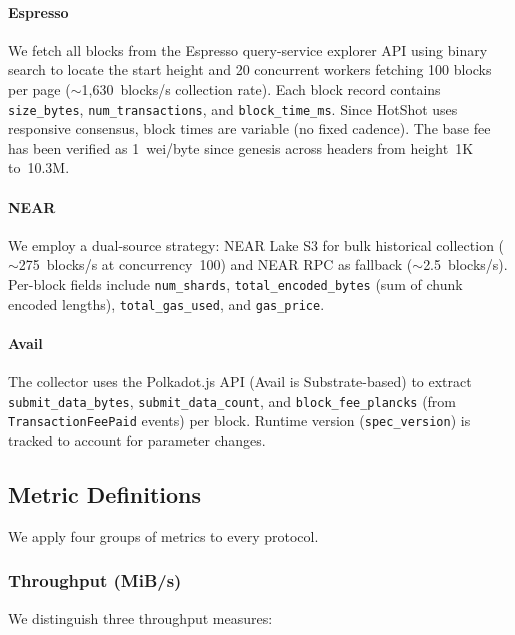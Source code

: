 \paragraph{Espresso}
We fetch all blocks from the Espresso query-service explorer API using binary search to locate the start height and 20 concurrent workers fetching 100 blocks per page ($\sim$1,630~blocks/s collection rate).
Each block record contains \texttt{size\_bytes}, \texttt{num\_transactions}, and \texttt{block\_time\_ms}.
Since HotShot uses responsive consensus, block times are variable (no fixed cadence).
The base fee has been verified as 1~wei/byte since genesis across headers from height~1K to~10.3M.

\paragraph{NEAR}
We employ a dual-source strategy: NEAR Lake S3 for bulk historical collection ($\sim$275~blocks/s at concurrency~100) and NEAR RPC as fallback ($\sim$2.5~blocks/s).
Per-block fields include \texttt{num\_shards}, \texttt{total\_encoded\_bytes} (sum of chunk encoded lengths), \texttt{total\_gas\_used}, and \texttt{gas\_price}.

\paragraph{Avail}
The collector uses the Polkadot.js API (Avail is Substrate-based) to extract \texttt{submit\_data\_bytes}, \texttt{submit\_data\_count}, and \texttt{block\_fee\_plancks} (from \texttt{TransactionFeePaid} events) per block.
Runtime version (\texttt{spec\_version}) is tracked to account for parameter changes.

\subsection{Metric Definitions}
\label{sec:meth-metrics}

We apply four groups of metrics to every protocol.

\subsubsection{Throughput (MiB/s)}

We distinguish three throughput measures:

